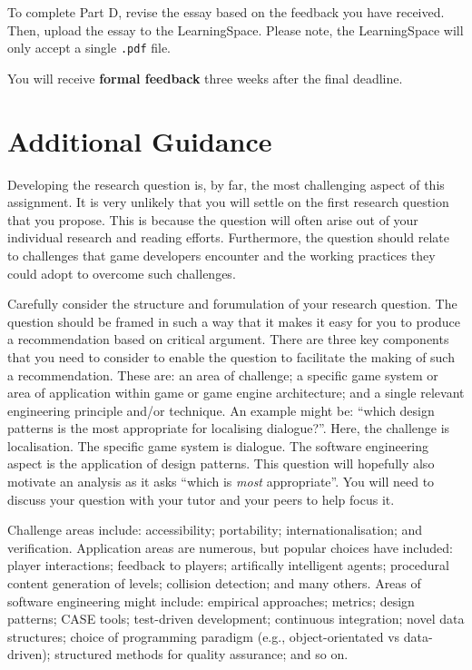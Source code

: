 \documentclass{../../fal_assignment}
\begin{document}
To complete Part D, revise the essay based on the feedback you have received. Then, upload the essay to the LearningSpace. Please note, the LearningSpace will only accept a single \texttt{.pdf} file.

You will receive \textbf{formal feedback} three weeks after the final deadline.

\section*{Additional Guidance}

Developing the research question is, by far, the most challenging aspect of this assignment. It is very unlikely that you will settle on the first research question that you propose. This is because the question will often arise out of your individual research and reading efforts. Furthermore, the question should relate to challenges that game developers encounter and the working practices they could adopt to overcome such challenges. 

Carefully consider the structure and forumulation of your research question. The question should be framed in such a way that it makes it easy for you to produce a recommendation based on critical argument. There are three key components that you need to consider to enable the question to facilitate the making of such a recommendation. These are: an area of challenge; a specific game system or area of application within game or game engine architecture; and a single relevant engineering principle and/or technique. An example might be: ``which design patterns is the most appropriate for localising dialogue?''. Here, the challenge is localisation. The specific game system is dialogue. The software engineering aspect is the application of design patterns. This question will hopefully also motivate an analysis as it asks ``which is \textit{most} appropriate''. You will need to discuss your question with your tutor and your peers to help focus it.

Challenge areas include: accessibility; portability; internationalisation; and verification. Application areas are numerous, but popular choices have included: player interactions; feedback to players; artifically intelligent agents; procedural content generation of levels; collision detection; and many others. Areas of software engineering might include: empirical approaches; metrics; design patterns; CASE tools; test-driven development; continuous integration; novel data structures; choice of programming paradigm (e.g., object-orientated vs data-driven); structured methods for quality assurance; and so on.
\end{document}
